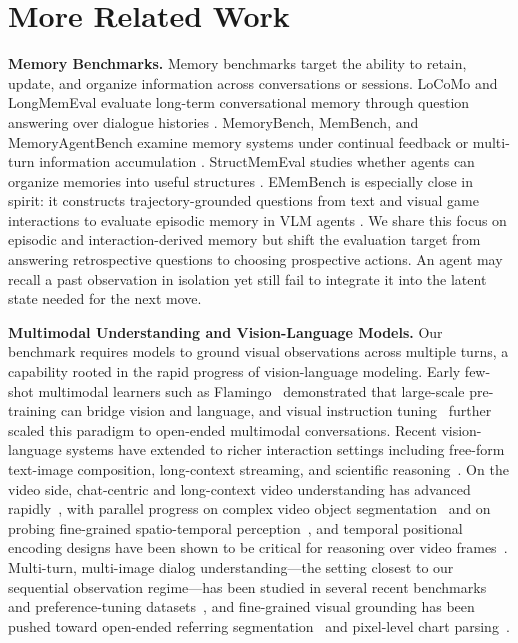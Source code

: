 \clearpage

\section{More Related Work}
\noindent\textbf{Memory Benchmarks.} Memory benchmarks target the ability to retain, update, and organize information across conversations or sessions. LoCoMo and LongMemEval evaluate long-term conversational memory through question answering over dialogue histories \citep{maharana2024locomo,wu2024longmemeval}. MemoryBench, MemBench, and MemoryAgentBench examine memory systems under continual feedback or multi-turn information accumulation \citep{ai2025memorybench,tan2025membench,hu2025memoryagentbench}. StructMemEval studies whether agents can organize memories into useful structures \citep{shutova2026structmemeval}. EMemBench is especially close in spirit: it constructs trajectory-grounded questions from text and visual game interactions to evaluate episodic memory in VLM agents \citep{li2026emembench}. We share this focus on episodic and interaction-derived memory but shift the evaluation target from answering retrospective questions to choosing prospective actions. An agent may recall a past observation in isolation yet still fail to integrate it into the latent state needed for the next move.

\noindent\textbf{Multimodal Understanding and Vision-Language Models.}
Our benchmark requires models to ground visual observations across multiple turns, a capability rooted in the rapid progress of vision-language modeling. Early few-shot multimodal learners such as Flamingo~\citep{alayrac2022flamingo} demonstrated that large-scale pre-training can bridge vision and language, and visual instruction tuning~\citep{liu2023llava} further scaled this paradigm to open-ended multimodal conversations. Recent vision-language systems have extended to richer interaction settings including free-form text-image composition, long-context streaming, and scientific reasoning~\citep{wxl_dong2024internlmxcomposer2,wxl_zhang2024omnilive,wxl_zou2026interns1pro}. On the video side, chat-centric and long-context video understanding has advanced rapidly~\citep{li2023videochat,wxl_chen2024sharegpt4video,wu2024longvideobench,fang2024mmbench, chen2025iwr}, with parallel progress on complex video object segmentation~\citep{zhang2026sec} and on probing fine-grained spatio-temporal perception~\citep{liu2026starbench}, and temporal positional encoding designs have been shown to be critical for reasoning over video frames~\citep{wxl_wei2025videorope}. Multi-turn, multi-image dialog understanding---the setting closest to our sequential observation regime---has been studied in several recent benchmarks and preference-tuning datasets~\citep{wxl_liu2024mmdu,ma2024mmlongbench,liu2025miadpo}, and fine-grained visual grounding has been pushed toward open-ended referring segmentation~\citep{zhang2026setcon} and pixel-level chart parsing~\citep{li2026visualselfrefine}.

